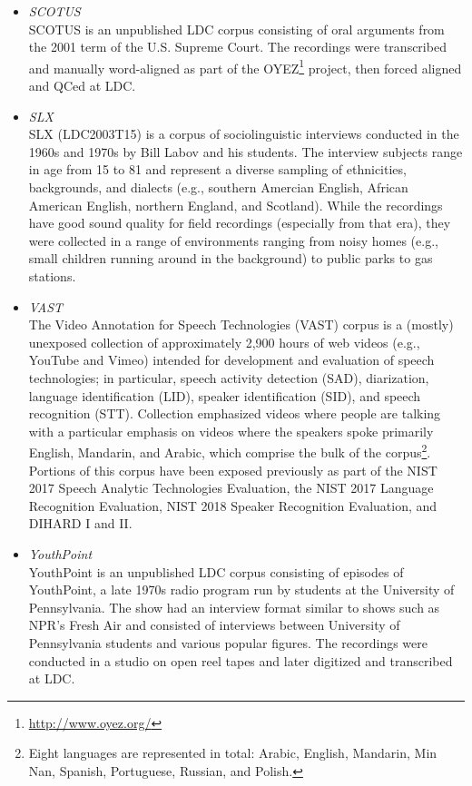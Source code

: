 \documentclass{article}
\begin{document}
\begin{appendices}
\begin{itemize}
        \item {\it SCOTUS} \\
            SCOTUS is an unpublished LDC corpus consisting of oral arguments from the 2001 term of the U.S. Supreme Court. The recordings were transcribed and manually word-aligned as part of the OYEZ\footnote{\url{http://www.oyez.org/}} project, then forced aligned and QCed at LDC.
        \item {\it SLX} \\
            SLX (LDC2003T15) is a corpus of sociolinguistic interviews conducted in the 1960s and 1970s by Bill Labov and his students. The interview subjects range in age from 15 to 81 and represent a diverse sampling of ethnicities, backgrounds, and dialects (e.g., southern Amercian English, African American English, northern England, and Scotland). While the recordings have good sound quality for field recordings (especially from that era), they were collected in a range of environments ranging from noisy homes (e.g., small children running around in the background) to public parks to gas stations.
        \item {\it VAST} \\
            The Video Annotation for Speech Technologies (VAST) corpus is a (mostly) unexposed collection of approximately 2,900 hours of web videos (e.g., YouTube and Vimeo) intended for development and evaluation of speech technologies; in particular, speech activity detection (SAD), diarization, language identification (LID), speaker identification (SID), and speech recognition (STT). Collection emphasized videos where people are talking with a particular emphasis on videos where the speakers spoke primarily English, Mandarin, and Arabic, which comprise the bulk of the corpus\footnote{Eight languages are represented in total: Arabic, English, Mandarin, Min Nan, Spanish, Portuguese, Russian, and Polish.}. Portions of this corpus have been exposed previously as part of the NIST 2017 Speech Analytic Technologies Evaluation, the  NIST 2017 Language Recognition Evaluation, NIST 2018 Speaker Recognition Evaluation, and DIHARD I and II.
        \item {\it YouthPoint} \\
            YouthPoint is an unpublished LDC corpus consisting of episodes of YouthPoint, a late 1970s radio program run by students at the University of Pennsylvania. The show had an interview format similar to shows such as NPR's Fresh Air and consisted of interviews between University of Pennsylvania students and various popular figures. The recordings were conducted in a studio on open reel tapes and later digitized and transcribed at LDC.
    \end{itemize}




\end{appendices}
\end{document}
